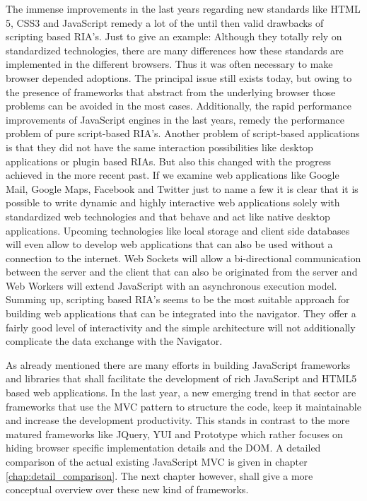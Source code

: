The immense improvements in the last years regarding new standards like HTML 5, CSS3 and JavaScript remedy a lot of the until then valid drawbacks of scripting based RIA's.
Just to give an example: Although they totally rely on standardized technologies, there are many differences how these standards are implemented in the different browsers.
Thus it was often necessary to make browser depended adoptions.
The principal issue still exists today, but owing to the presence of frameworks that abstract from the underlying browser those problems can be avoided in the most cases.
Additionally, the rapid performance improvements of JavaScript engines in the last years, remedy the performance problem of pure script-based RIA's.
Another problem of script-based applications is that they did not have the same  interaction possibilities like desktop applications or plugin based RIAs.
But also this changed with the progress achieved in the more recent past.
If we examine web applications like Google Mail, Google Maps, Facebook and Twitter just to name a few it is clear that it is possible to write dynamic and highly interactive web applications solely with standardized web technologies and that behave and act like native desktop applications.
Upcoming technologies like local storage and client side databases will even allow to develop web applications that can also be used without a connection to the internet.
Web Sockets will allow a bi-directional communication between the server and the client that can also be originated from the server and Web Workers will extend JavaScript with an asynchronous execution model.
Summing up, scripting based RIA's seems to be the most suitable approach for building web applications that can be integrated into the navigator. 
They offer a fairly good level of interactivity and the simple architecture will not additionally complicate the data exchange with the Navigator. 


As already mentioned there are many efforts in building JavaScript frameworks and libraries that shall facilitate the development of rich JavaScript and HTML5 based web applications.
In the last year, a new emerging trend in that sector are frameworks that use the MVC pattern to structure the code, keep it maintainable and increase the development productivity.
This stands in contrast to the more matured frameworks like JQuery, YUI and Prototype which rather focuses on hiding browser specific implementation details and the DOM.
A detailed comparison of the actual existing JavaScript MVC is given in chapter \ref{chap:detail_comparison}.
The next chapter however, shall give a more conceptual overview over these new kind of frameworks.
 
